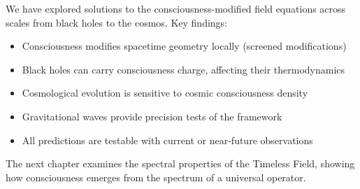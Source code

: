 We have explored solutions to the consciousness-modified field equations across scales from black holes to the cosmos. Key findings:

\begin{itemize}
\item Consciousness modifies spacetime geometry locally (screened modifications)
\item Black holes can carry consciousness charge, affecting their thermodynamics
\item Cosmological evolution is sensitive to cosmic consciousness density
\item Gravitational waves provide precision tests of the framework
\item All predictions are testable with current or near-future observations
\end{itemize}

The next chapter examines the spectral properties of the Timeless Field, showing how consciousness emerges from the spectrum of a universal operator.

